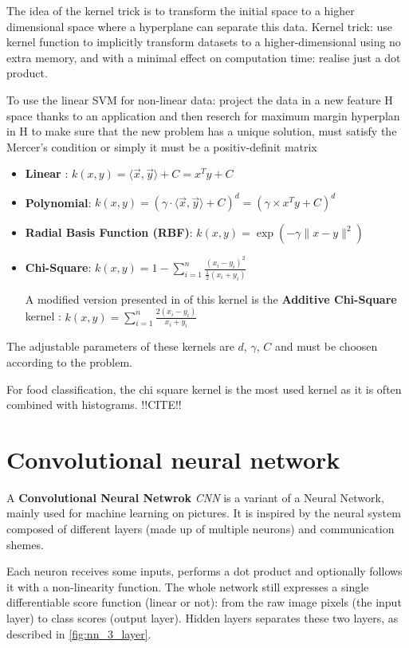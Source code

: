 The idea of the kernel trick is to transform the initial space to a higher dimensional space where a hyperplane can separate this data.
Kernel trick: use kernel function to implicitly transform datasets to a higher-dimensional using no extra memory, and with a minimal effect on computation time: realise just a dot product.

To use the linear SVM for non-linear data: project the data in a new feature H space thanks to an application and then reserch for maximum margin hyperplan in H
to make sure that the new problem has a unique solution, 
must satisfy the Mercer's condition or simply it must be a positiv-definit matrix

\begin{itemize}
    \item \textbf{Linear} : $k(x, y) = \langle \vec{x} , \vec{y} \rangle + C = x^T y + C$
    \item \textbf{Polynomial}: $k(x, y) = (\gamma \cdot \langle \vec{x} , \vec{y} \rangle + C)^d = (\gamma \times x^T y + C)^d$
    \item \textbf{Radial Basis Function (RBF)}: $k(x, y) = \exp \left( - \gamma \lVert x - y \rVert ^2 \right)$
    \item \textbf{Chi-Square}: $\displaystyle k(x, y) = 1 - \sum_{i=1}^n \frac{(x_i-y_i)^2}{\frac{1}{2} (x_i+y_i)}$
    
    A modified version presented in \cite{Vedaldi2010} of this kernel is the \textbf{Additive Chi-Square} kernel :
    $\displaystyle k(x, y) = \sum_{i=1}^n \frac{2 (x_i - y_i)}{x_i + y_i} $
\end{itemize}

The adjustable parameters of these kernels are $d$, $\gamma$, $C$ and must be choosen according to the problem.

For food classification, the chi square kernel is the most used kernel as it is often combined with histograms. !!CITE!!

\section{Convolutional neural network}

A \textbf{Convolutional Neural Netwrok} \textit{CNN} is a variant of a Neural Network, mainly used for machine learning on pictures. It is inspired by the neural system composed of different layers (made up of multiple neurons) and communication shemes.

Each neuron receives some inputs, performs a dot product and optionally follows it with a non-linearity function. The whole network still expresses a single differentiable score function (linear or not): from the raw image pixels (the input layer) to class scores (output layer). Hidden layers separates these two layers, as described in \ref{fig:nn_3_layer}.

